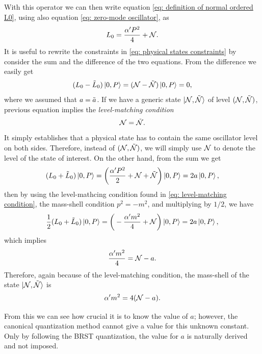 With this operator we can then write equation \eqref{eq: definition of normal ordered L0}, using also equation \eqref{eq: zero-mode oscillator}, as
\begin{equation}
    L_0 = \frac{\alpha'P^2}{4} + \mathcal{N}.
\end{equation}
It is useful to rewrite the constraints in \eqref{eq: physical states constraints} by consider the sum and the difference of the two equations. From the difference we easily get 
\begin{equation}
    (L_0 - \tilde{L}_0)\ket{0,P} = (\mathcal{N} - \tilde{\mathcal{N}})\ket{0,P} = 0,    
\end{equation}
where we assumed that $a = \tilde{a}$. If we have a generic state $\ket{\mathcal{N},\tilde{\mathcal{N}}}$ of level $(\mathcal{N},\tilde{\mathcal{N}})$, previous equation implies the \emph{level-matching condition}
\begin{equation}
\label{eq: level-matching condition}
    \mathcal{N} = \tilde{\mathcal{N}}.
\end{equation}
It simply establishes that a physical state has to contain the same oscillator level on both sides. Therefore, instead of $(\mathcal{N}, \tilde{\mathcal{N}})$, we will simply use $\mathcal{N}$ to denote the level of the state of interest. On the other hand, from the sum we get 
\begin{equation}
    (L_0 + \tilde{L}_0)\ket{0,P} = \bigg(\frac{\alpha'P^2}{2} + \mathcal{N} + \tilde{\mathcal{N}}\bigg)\ket{0,P} = 2a\ket{0,P},
\end{equation}
then by using the level-mathcing condition found in \eqref{eq: level-matching condition}, the mass-shell condition $p^2 = -m^2$, and multiplying by $1/2$, we have 
\begin{equation}
    \frac{1}{2}(L_0 + \tilde{L}_0)\ket{0,P} = \bigg(-\frac{\alpha'm^2}{4} + \mathcal{N}\bigg)\ket{0,P} = 2a\ket{0,P},
\end{equation}
which implies  
\begin{equation}
    \frac{\alpha'm^2}{4} = \mathcal{N} - a.
\end{equation}
Therefore, again because of the level-matching condition, the mass-shell of the state $\ket{\mathcal{N},\tilde{\mathcal{N}}}$ is 
\begin{equation}
\label{eq: mass-shell for state N}
    \alpha'm^2 = 4(\mathcal{N} - a).
\end{equation}
\begin{obs}
    From this we can see how crucial it is to know the value of $a$; however, the canonical quantization method cannot give a value for this unknown constant. Only by following the BRST quantization, the value for $a$ is naturally derived and not imposed. 
\end{obs}

